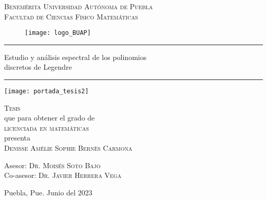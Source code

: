 
\thispagestyle{empty} %

\begin{center}
{\Large{
\textsc{Benemérita Universidad Autónoma de Puebla}
}} \\
\vspace{0.5cm}
{\Large{
\textsc{Facultad de Ciencias Físico Matemáticas}
}}
\end{center}


\begin{figure}[H]
	\centering
	\texttt{[image: logo\_BUAP]} 
\end{figure}	



\hrule
\vspace{0.5cm}
\begin{center}
{\Large {Estudio y análisis espectral de los polinomios \\
discretos de Legendre}}
\end{center}
\vspace{0.5cm}
\hrule


\begin{marginfigure}
\texttt{[image: portada\_tesis2]} 
\end{marginfigure}






\vspace{4cm}

\noindent
\textsc{Tesis} \\
que para obtener el grado de \\
\textsc{licenciada en matemáticas} \\
presenta \\
\textsc{Denisse Amélie Sophie Bernès Carmona}



\vspace{2cm}

\noindent
Asesor: \textsc{Dr. Moisés Soto Bajo} \\
Co-asesor: \textsc{Dr. Javier Herrera Vega} 




\vspace*{\fill}
Puebla, Pue. Junio del 2023 









\newpage
